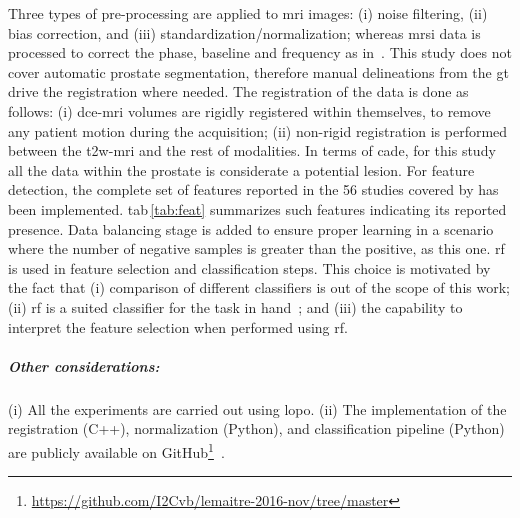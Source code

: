 \documentclass[num-refs]{wiley-article}
\begin{document}
Three types of pre-processing are applied to \ac{mri} images: (i) noise filtering,
(ii) bias correction, and (iii) standardization/normalization; whereas
\ac{mrsi} data is processed to correct the phase, baseline and frequency
as in \citeauthor{Chen2002}\,\cite{Chen2002}.
%
This study does not cover automatic prostate segmentation, therefore manual
delineations from the \ac{gt} drive the registration where needed.
The registration of the data is done as follows: (i) \ac{dce}-\ac{mri} volumes
are rigidly registered within themselves, to remove any patient motion during
the acquisition; (ii) non-rigid registration is performed between the
\ac{t2w}-\ac{mri} and the rest of modalities.
%
In terms of \ac{cade}, for this study all the data within the prostate is
considerate a potential lesion.
%
For feature detection, the complete set of features reported in the 56 studies
covered by \cite{lemaitre2015computer} has been implemented.
\Ac{tab}\,\ref{tab:feat} summarizes such features indicating its reported presence.
%
Data balancing stage is added to ensure proper learning in a scenario where the
number of negative samples is greater than the positive, as this one.
%
\ac{rf} is used in feature selection and classification steps. This choice is
motivated by the fact that
(i) comparison of different classifiers is out of the
scope of this work;
(ii) \ac{rf} is a suited classifier for the task in
hand~\cite{lemaitre2015computer};
and (iii) the capability to interpret the feature selection when performed using \ac{rf}.


\subparagraph{Other considerations:}
(i) All the experiments are carried out using \ac{lopo}.
(ii) The implementation of the registration (C++), normalization (Python), and
classification pipeline (Python) are publicly available on
GitHub\footnote{\url{https://github.com/I2Cvb/lemaitre-2016-nov/tree/master}}~\citep{lemaitre2016github}.
\end{document}
